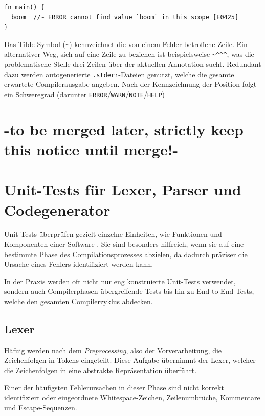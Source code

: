\documentclass[a4paper,11pt]{article}
\begin{document}
\begin{verbatim}
fn main() {
  boom  //~ ERROR cannot find value `boom` in this scope [E0425]
}
\end{verbatim}

Das Tilde-Symbol (\texttt{\textasciitilde}) kennzeichnet die von einem Fehler betroffene Zeile. Ein alternativer Weg, sich auf eine Zeile zu beziehen ist beispielsweise \texttt{\textasciitilde \textasciicircum \textasciicircum \textasciicircum}, was die problematische Stelle drei Zeilen über der aktuellen Annotation sucht. Redundant dazu werden autogenerierte \texttt{.stderr}-Dateien genutzt, welche die gesamte erwartete Compilerausgabe angeben. Nach der Kennzeichnung der Position folgt ein Schweregrad (darunter \texttt{ERROR}/\texttt{WARN}/\texttt{NOTE}/\texttt{HELP}) \parencite{rust_ui_tests}

\section{-to be merged later, strictly keep this notice until merge!-}

\section{Unit-Tests für Lexer, Parser und Codegenerator}

Unit-Tests überprüfen gezielt einzelne Einheiten, wie Funktionen und Komponenten einer Software \parencite{meszaros2007}. Sie sind besonders hilfreich, wenn sie auf eine bestimmte Phase des Compilationsprozesses abzielen, da dadurch präziser die Ursache eines Fehlers identifiziert werden kann. 

In der Praxis werden oft nicht nur eng konstruierte Unit-Tests verwendet, sondern auch Compilerphasen-übergreifende Tests bis hin zu End-to-End-Tests, welche den gesamten Compilerzyklus abdecken.

\subsection{Lexer}

Häfuig werden nach dem \emph{Preprocessing}, also der Vorverarbeitung, die Zeichenfolgen in Tokens eingeteilt. Diese Aufgabe übernimmt der Lexer, welcher die Zeichenfolgen in eine abstrakte Repräsentation überführt. \parencite{ibm_compiler_phases}

Einer der häufigsten Fehlerursachen in dieser Phase sind nicht korrekt identifiziert oder eingeordnete Whitespace-Zeichen, Zeilenumbrüche, Kommentare und Escape-Sequenzen. \parencite{gcc_preprocessor_internals}
\end{document}
